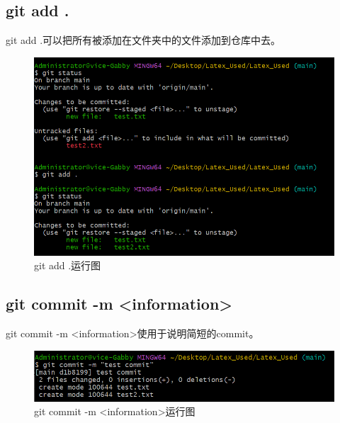 \documentclass{article}
\begin{document}
\subsection{git add .}
git add .可以把所有被添加在文件夹中的文件添加到仓库中去。
\begin{figure}[H]
    \centering
    \includegraphics[width=1\linewidth]{git_add.png}
    \caption{git add .运行图}
    \label{fig:addall}
\end{figure}

\subsection{git commit -m <information>}
git commit -m <information>使用于说明简短的commit。
\begin{figure}[H]
    \centering
    \includegraphics[width=1\linewidth]{git_commit.png}
    \caption{git commit -m <information>运行图}
    \label{fig:commit}
\end{figure}
\end{document}
